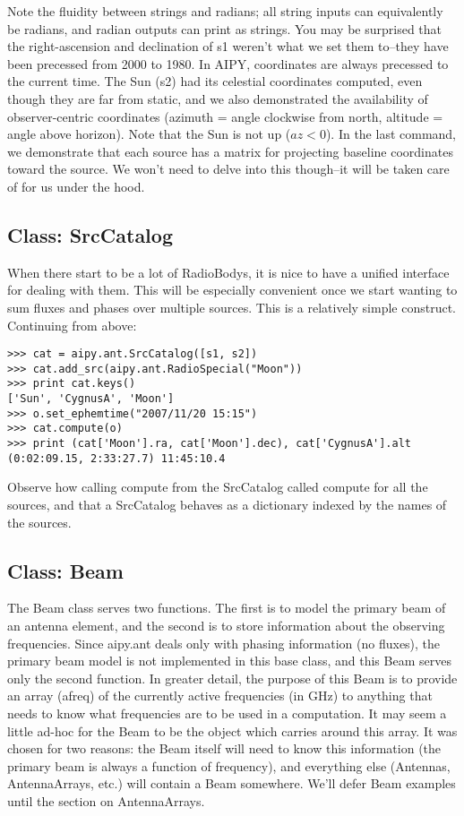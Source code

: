 Note the fluidity between strings and radians; all string inputs can
equivalently be radians, and radian outputs can print as strings.  You may
be surprised that the right-ascension and declination of s1 weren't what
we set them to--they have been precessed from 2000 to 1980.  In AIPY, 
coordinates are always precessed to the current time.  The Sun (s2) had its 
celestial coordinates computed, even though they are far from static, and
we also demonstrated the availability of observer-centric coordinates
(azimuth = angle clockwise from north, altitude = angle above horizon).
Note that the Sun is not up ($az<0$).  In the last command, we demonstrate that
each source has a matrix for projecting baseline coordinates toward
the source.  We won't need to delve into this though--it will be taken care
of for us under the hood.

\subsection{Class: SrcCatalog}

When there start to be a lot of RadioBodys, it is nice to have a unified
interface for dealing with them.  This will be especially convenient once
we start wanting to sum fluxes and phases over multiple sources.  This
is a relatively simple construct.  Continuing from above:

\begin{verbatim}
>>> cat = aipy.ant.SrcCatalog([s1, s2])
>>> cat.add_src(aipy.ant.RadioSpecial("Moon"))
>>> print cat.keys()
['Sun', 'CygnusA', 'Moon']
>>> o.set_ephemtime("2007/11/20 15:15")
>>> cat.compute(o)
>>> print (cat['Moon'].ra, cat['Moon'].dec), cat['CygnusA'].alt
(0:02:09.15, 2:33:27.7) 11:45:10.4
\end{verbatim}

Observe how calling compute from the SrcCatalog called compute for all
the sources, and that a SrcCatalog behaves as a dictionary indexed by
the names of the sources.

\subsection{Class: Beam}

The Beam class serves two functions.  The first is to model the primary
beam of an antenna element, and the second is to store information about the
observing frequencies.  Since aipy.ant deals only with phasing information
(no fluxes), the primary beam model is not implemented in this base class,
and this Beam serves only the second function.  In greater detail, the
purpose of this Beam is to provide an array (afreq) of the currently
active frequencies (in GHz) to anything that needs to know what frequencies
are to be used in a computation.  It may seem a little ad-hoc for the Beam to 
be the object which carries around this array.  It was chosen for two
reasons: the Beam itself will need to know this information (the primary
beam is always a function of frequency), and everything else (Antennas,
AntennaArrays, etc.) will contain a Beam somewhere.  We'll defer 
Beam examples until the section on AntennaArrays.

